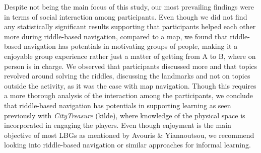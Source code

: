 Despite not being the main focus of this study, our most prevailing findings were in terms of social interaction among participants. Even though we did not find any statistically significant results supporting that participants helped each other more during riddle-based navigation, compared to a map, we found that riddle-based navigation has potentials in motivating groups of people, making it a enjoyable group experience rather just a matter of getting from A to B, where on person is in charge. We observed that participants discussed more and that topics revolved around solving the riddles, discussing the landmarks and not on topics outside the activity, as it was the case with map navigation. Though this requires a more thorough analysis of the interaction among the participants, we conclude that riddle-based navigation has potentials in supporting learning as seen previously with \textit{CityTreasure} (kilde), where knowledge of the physical space is incorporated in engaging the players. Even though enjoyment is the main objective of most LBGs as mentioned by Avouris \& Yiannoutsou, we recommend looking into riddle-based navigation or similar approaches for informal learning. 




